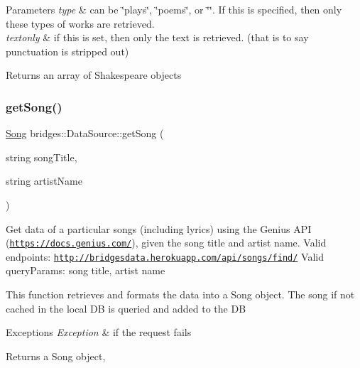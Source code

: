 \begin{DoxyParams}{Parameters}
{\em type} & can be \char`\"{}plays\char`\"{}, \char`\"{}poems\char`\"{}, or \char`\"{}\char`\"{}. If this is specified, then only these types of works are retrieved. \\
\hline
{\em textonly} & if this is set, then only the text is retrieved. (that is to say punctuation is stripped out)\\
\hline
\end{DoxyParams}
\begin{DoxyReturn}{Returns}
an array of Shakespeare objects 
\end{DoxyReturn}
\mbox{\label{classbridges_1_1_data_source_a284c9d572415b67df6989ab8ab97d0e2}} 
\subsubsection{\texorpdfstring{get\+Song()}{getSong()}}
{\footnotesize\ttfamily \hyperlink{classbridges_1_1dataset_1_1_song}{Song} bridges\+::\+Data\+Source\+::get\+Song (\begin{DoxyParamCaption}\item[{string}]{song\+Title,  }\item[{string}]{artist\+Name }\end{DoxyParamCaption})\hspace{0.3cm}{\ttfamily [inline]}}

Get data of a particular songs (including lyrics) using the Genius A\+PI (\href{https://docs.genius.com/}{\tt https\+://docs.\+genius.\+com/}), given the song title and artist name. Valid endpoints\+: \href{http://bridgesdata.herokuapp.com/api/songs/find/}{\tt http\+://bridgesdata.\+herokuapp.\+com/api/songs/find/} Valid query\+Params\+: song title, artist name

This function retrieves and formats the data into a Song object. The song if not cached in the local DB is queried and added to the DB


\begin{DoxyExceptions}{Exceptions}
{\em Exception} & if the request fails\\
\hline
\end{DoxyExceptions}
\begin{DoxyReturn}{Returns}
a Song object, 
\end{DoxyReturn}
\mbox{\label{classbridges_1_1_data_source_a5e8d035a1becf96c71569e0966e93849}} 
